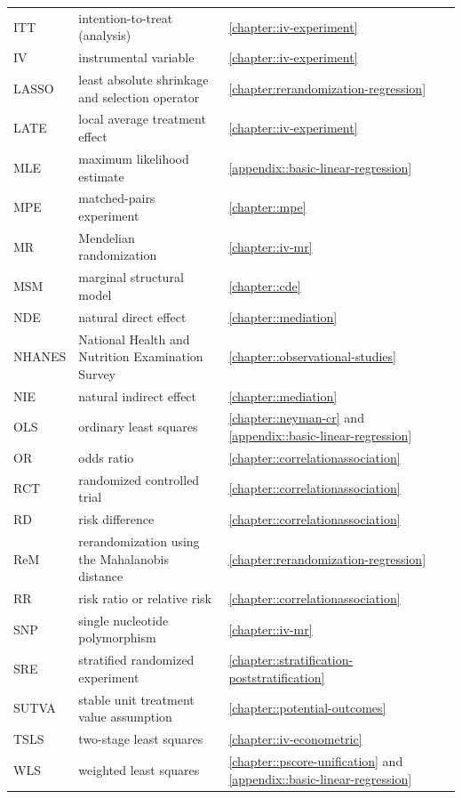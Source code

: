 \begin{tabular}{lll}
ITT & intention-to-treat (analysis) &  \ref{chapter::iv-experiment} \\
 IV & instrumental variable &  \ref{chapter::iv-experiment} \\
 LASSO & least absolute shrinkage and selection operator & \ref{chapter:rerandomization-regression}\\
   LATE & local average treatment effect & \ref{chapter::iv-experiment} \\
    MLE & maximum likelihood estimate & \ref{appendix::basic-linear-regression} \\
 MPE & matched-pairs experiment & \ref{chapter::mpe}\\
  MR & Mendelian randomization & \ref{chapter::iv-mr} \\
 MSM & marginal structural model & \ref{chapter::cde} \\
 NDE& natural direct effect & \ref{chapter::mediation} \\
 NHANES & National Health and Nutrition Examination Survey & \ref{chapter::observational-studies}\\
 NIE & natural indirect effect & \ref{chapter::mediation} \\
    OLS & ordinary least squares & \ref{chapter::neyman-cr} and \ref{appendix::basic-linear-regression}\\
OR & odds ratio & \ref{chapter::correlationassociation}\\
 RCT & randomized controlled trial & \ref{chapter::correlationassociation}\\
 RD & risk difference & \ref{chapter::correlationassociation} \\
 ReM & rerandomization using the Mahalanobis distance & \ref{chapter:rerandomization-regression}\\
RR & risk ratio or relative risk & \ref{chapter::correlationassociation}\\
SNP & single nucleotide polymorphism & \ref{chapter::iv-mr} \\
  SRE& stratified randomized experiment & \ref{chapter::stratification-poststratification}\\
 SUTVA & stable unit treatment value assumption & \ref{chapter::potential-outcomes} \\
 TSLS & two-stage least squares & \ref{chapter::iv-econometric} \\
   WLS & weighted least squares & \ref{chapter::pscore-unification} and \ref{appendix::basic-linear-regression}\\
\hline 
\end{tabular}
 

